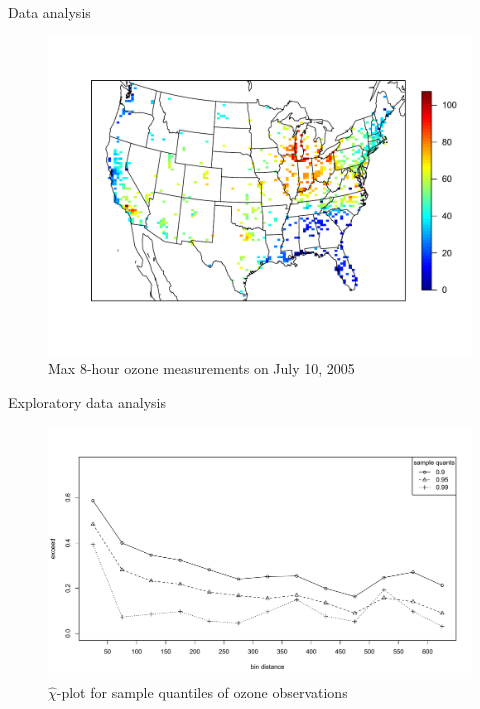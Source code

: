 \documentclass{beamer}
\begin{document}
\begin{frame}{Data analysis}
  \centering
  \begin{figure}
    \includegraphics[width=\linewidth, trim=0 1in 0 0in ]{./plots/pot/ozone-10jul-us.pdf}
    \caption{Max 8-hour ozone measurements on July 10, 2005}
   \end{figure}
\end{frame}

\begin{frame}{Exploratory data analysis}
	\centering
  \begin{figure}
    \includegraphics[width=1\linewidth]{./plots/pot/chi-plot-ozone-res.pdf}
    \caption{$\widehat{\chi}$-plot for sample quantiles of ozone observations}
  \end{figure}
\end{frame}
\end{document}
